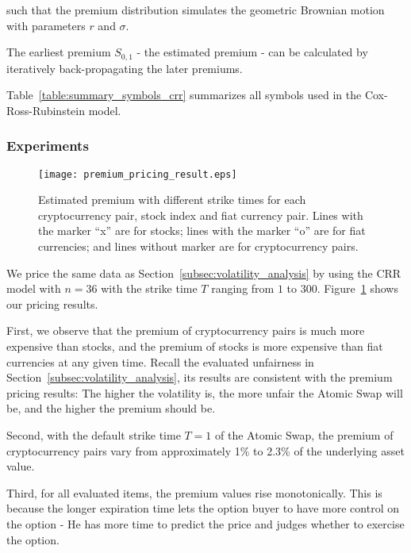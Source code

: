 such that the premium distribution simulates the geometric Brownian motion with parameters $r$ and $\sigma$.

The earliest premium $S_{0, 1}$ - the estimated premium - can be calculated by iteratively back-propagating the later premiums. 

Table~\ref{table:summary_symbols_crr} summarizes all symbols used in the Cox-Ross-Rubinstein model. 

\subsubsection{Experiments}

\begin{figure}
    \texttt{[image: premium\_pricing\_result.eps]}
    \caption{Estimated premium with different strike times for each cryptocurrency pair, stock index and fiat currency pair. Lines with the marker ``x'' are for stocks; lines with the marker ``o'' are for fiat currencies; and lines without marker are for cryptocurrency pairs.}
    \label{fig:premium_pricing_result}
\end{figure}

We price the same data as Section~\ref{subsec:volatility_analysis} by using the CRR model with $n = 36$ with the strike time $T$ ranging from $1$ to $300$.
Figure~\ref{fig:premium_pricing_result} shows our pricing results.

First, we observe that the premium of cryptocurrency pairs is much more expensive than stocks, and the premium of stocks is more expensive than fiat currencies at any given time.
Recall the evaluated unfairness in Section~\ref{subsec:volatility_analysis}, its results are consistent with the premium pricing results: The higher the volatility is, the more unfair the Atomic Swap will be, and the higher the premium should be.

Second, with the default strike time $T = 1$ of the Atomic Swap, the premium of cryptocurrency pairs vary from approximately 1\% to 2.3\% of the underlying asset value.

Third, for all evaluated items, the premium values rise monotonically.
This is because the longer expiration time lets the option buyer to have more control on the option - He has more time to predict the price and judges whether to exercise the option.